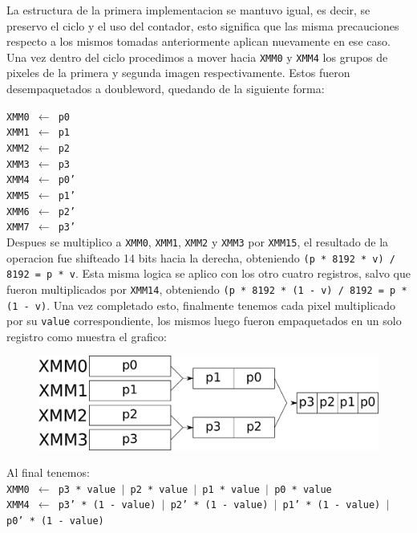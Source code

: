 La estructura de la primera implementacion se mantuvo igual, es decir, se preservo el ciclo y el uso del contador, esto significa que las misma precauciones respecto a los mismos tomadas anteriormente aplican nuevamente en ese caso. Una vez dentro del ciclo procedimos a mover hacia \texttt{XMM0} y \texttt{XMM4} los grupos de pixeles de la primera y segunda imagen respectivamente. Estos fueron desempaquetados a doubleword, quedando de la siguiente forma:

\noindent
\texttt{XMM0 $\gets$ p0}\\
\texttt{XMM1 $\gets$ p1}\\
\texttt{XMM2 $\gets$ p2}\\
\texttt{XMM3 $\gets$ p3}\\
\texttt{XMM4 $\gets$ p0'}\\
\texttt{XMM5 $\gets$ p1'}\\
\texttt{XMM6 $\gets$ p2'}\\
\texttt{XMM7 $\gets$ p3'}\\

Despues se multiplico a \texttt{XMM0}, \texttt{XMM1}, \texttt{XMM2} y \texttt{XMM3} por \texttt{XMM15}, el resultado de la operacion fue shifteado 14 bits hacia la derecha, obteniendo \texttt{(p * 8192 * v) / 8192 = p * v}. Esta misma logica se aplico con los otro cuatro registros, salvo que fueron multiplicados por \texttt{XMM14}, obteniendo \texttt{(p * 8192 * (1 - v) / 8192 = p * (1 - v)}. Una vez completado esto, finalmente tenemos cada pixel multiplicado por su \texttt{value} correspondiente, los mismos luego fueron empaquetados en un solo registro como muestra el grafico:

\begin{figure}[h!]
	\centering
	\includegraphics[scale=0.5]{images/MergeASM2_1}
\end{figure}

Al final tenemos:\\

\noindent
\texttt{XMM0 $\gets$ p3 * value $\vert$ p2 * value $\vert$ p1 * value $\vert$ p0 * value}\\
\texttt{XMM4 $\gets$ p3' * (1 - value) $\vert$ p2' * (1 - value) $\vert$ p1' * (1 - value) $\vert$ p0' * (1 - value)}\\

